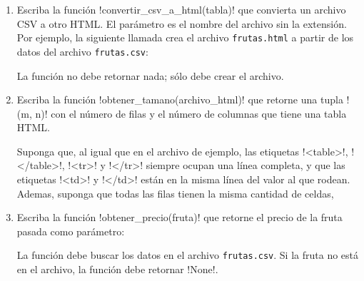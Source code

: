 \begin{enumerate}[leftmargin=0pt,label=\emph{\alph*})]

  \item
    Escriba la función \li!convertir_csv_a_html(tabla)!
    que convierta un archivo CSV a otro HTML\@.
    El parámetro es el nombre del archivo sin la extensión.
    Por ejemplo,
    la siguiente llamada crea el archivo \verb!frutas.html!
    a partir de los datos del archivo \verb!frutas.csv!:
    

    La función no debe retornar nada; sólo debe crear el archivo.

  \item
    Escriba la función \li!obtener_tamano(archivo_html)!
    que retorne una tupla \li!(m, n)!
    con el número de filas y el número de columnas
    que tiene una tabla HTML.
    

    \newcommand\lh{\li[language=html]}

    Suponga que, al igual que en el archivo de ejemplo,
    las etiquetas \lh!<table>!, \lh!</table>!, \lh!<tr>! y \lh!</tr>!
    siempre ocupan una línea completa,
    y que las etiquetas \lh!<td>! y \lh!</td>!
    están en la misma línea del valor al que rodean.
    Ademas,
    suponga que todas las filas tienen
    la misma cantidad de celdas,

  \item
    Escriba la función \li!obtener_precio(fruta)! que
    retorne el precio de la fruta pasada como parámetro:
    

    La función debe buscar los datos en el archivo \verb!frutas.csv!.
    Si la fruta no está en el archivo,
    la función debe retornar \li!None!.

\end{enumerate}
